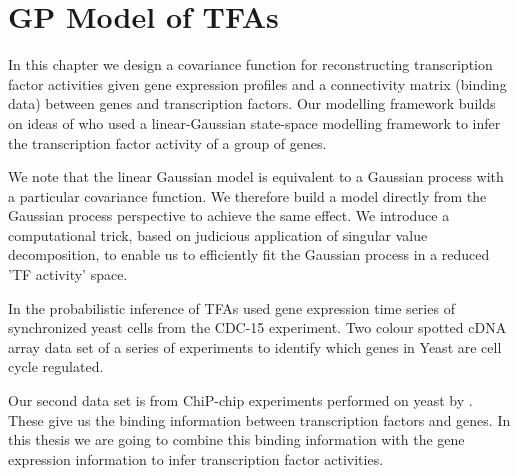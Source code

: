 
\chapter{GP Model of TFAs}\label{ch:GP_Model_of_TFAs}

\ifpdf
    \graphicspath{{Chapter4/Figs/Raster/}{Chapter4/Figs/PDF/}{Chapter4/Figs/}}
\else
    \graphicspath{{Chapter4/Figs/Vector/}{Chapter4/Figs/}}
\fi

In this chapter we design a covariance function for reconstructing transcription factor activities given gene expression profiles and a connectivity matrix (binding data) between genes and transcription factors. Our modelling framework builds on ideas of \cite{Sanguinetti:2006} who used a linear-Gaussian state-space modelling framework to infer the transcription factor activity of a group of genes. 

We note that the linear Gaussian model is equivalent to a Gaussian process with a particular covariance function. We therefore build a model directly from the Gaussian process perspective to achieve the same effect. We introduce a computational trick, based on  judicious application of singular value decomposition, to enable us to efficiently fit the Gaussian process in a reduced 'TF activity' space. 

In the probabilistic inference of TFAs \cite{Spellman:1998} used gene expression time series of synchronized yeast cells from the CDC-15 experiment. Two colour spotted cDNA array data set of a series of experiments to identify which genes in Yeast are cell cycle regulated. %

Our second data set is from ChiP-chip experiments performed on yeast by \cite{Lee:2002}. These give us the binding information between transcription factors and genes. In this thesis we are going to combine this binding information with the gene expression information to infer transcription factor activities.

